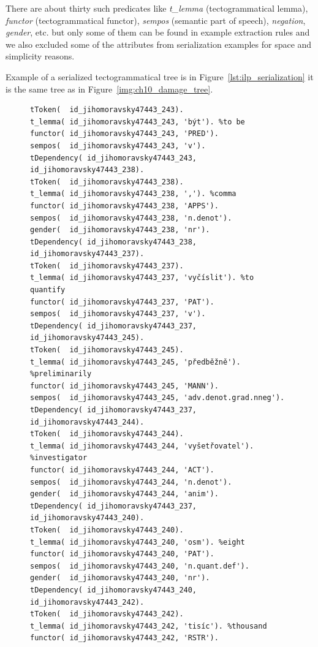 \noindent There are about thirty such predicates like \emph{t\_lemma} (tectogrammatical lemma), \emph{functor} (tectogrammatical functor), \emph{sempos} (semantic part of speech), \emph{negation}, \emph{gender}, etc. but only some of them can be found in example extraction rules and we also excluded some of the attributes from serialization examples for space and simplicity reasons.

Example of a serialized tectogrammatical tree is in Figure~\ref{lst:ilp_serialization} it is the same tree as in Figure~\ref{img:ch10_damage_tree}.


\begin{figure}
\begin{verbatim}
tToken(  id_jihomoravsky47443_243).
t_lemma( id_jihomoravsky47443_243, 'být'). %to be
functor( id_jihomoravsky47443_243, 'PRED').
sempos(  id_jihomoravsky47443_243, 'v').
tDependency( id_jihomoravsky47443_243, id_jihomoravsky47443_238).
tToken(  id_jihomoravsky47443_238).
t_lemma( id_jihomoravsky47443_238, ','). %comma
functor( id_jihomoravsky47443_238, 'APPS').
sempos(  id_jihomoravsky47443_238, 'n.denot').
gender(  id_jihomoravsky47443_238, 'nr').
tDependency( id_jihomoravsky47443_238, id_jihomoravsky47443_237).
tToken(  id_jihomoravsky47443_237).
t_lemma( id_jihomoravsky47443_237, 'vyčíslit'). %to quantify
functor( id_jihomoravsky47443_237, 'PAT').
sempos(  id_jihomoravsky47443_237, 'v').
tDependency( id_jihomoravsky47443_237, id_jihomoravsky47443_245).
tToken(  id_jihomoravsky47443_245).
t_lemma( id_jihomoravsky47443_245, 'předběžně'). %preliminarily
functor( id_jihomoravsky47443_245, 'MANN').
sempos(  id_jihomoravsky47443_245, 'adv.denot.grad.nneg').
tDependency( id_jihomoravsky47443_237, id_jihomoravsky47443_244).
tToken(  id_jihomoravsky47443_244).
t_lemma( id_jihomoravsky47443_244, 'vyšetřovatel'). %investigator
functor( id_jihomoravsky47443_244, 'ACT').
sempos(  id_jihomoravsky47443_244, 'n.denot').
gender(  id_jihomoravsky47443_244, 'anim').
tDependency( id_jihomoravsky47443_237, id_jihomoravsky47443_240).
tToken(  id_jihomoravsky47443_240).
t_lemma( id_jihomoravsky47443_240, 'osm'). %eight
functor( id_jihomoravsky47443_240, 'PAT').
sempos(  id_jihomoravsky47443_240, 'n.quant.def').
gender(  id_jihomoravsky47443_240, 'nr').
tDependency( id_jihomoravsky47443_240, id_jihomoravsky47443_242).
tToken(  id_jihomoravsky47443_242).
t_lemma( id_jihomoravsky47443_242, 'tisíc'). %thousand
functor( id_jihomoravsky47443_242, 'RSTR').

\end{verbatim}
\end{figure}
